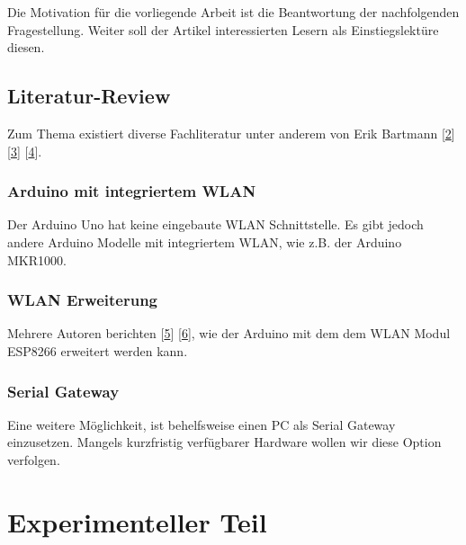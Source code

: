 \documentclass[
  ngerman,
  a4paper,
  12pt]{scrartcl}
\begin{document}
Die Motivation für die vorliegende Arbeit ist die Beantwortung der
nachfolgenden Fragestellung. Weiter soll der Artikel interessierten
Lesern als Einstiegslektüre diesen.

\hypertarget{literatur-review}{%
\subsection{Literatur-Review}\label{literatur-review}}

Zum Thema existiert diverse Fachliteratur unter anderem von Erik
Bartmann {[}\protect\hyperlink{ref-bartmannArduino}{2}{]}
{[}\protect\hyperlink{ref-bartmannESP8266}{3}{]}
{[}\protect\hyperlink{ref-bartmannESP32}{4}{]}.

\hypertarget{arduino-mit-integriertem-wlan}{%
\subsubsection{Arduino mit integriertem
WLAN}\label{arduino-mit-integriertem-wlan}}

Der Arduino Uno hat keine eingebaute WLAN Schnittstelle. Es gibt jedoch
andere Arduino Modelle mit integriertem WLAN, wie z.B. der Arduino
MKR1000.

\hypertarget{wlan-erweiterung}{%
\subsubsection{WLAN Erweiterung}\label{wlan-erweiterung}}

Mehrere Autoren berichten
{[}\protect\hyperlink{ref-temperatureDashboard}{5}{]}
{[}\protect\hyperlink{ref-websocketcommunication}{6}{]}, wie der Arduino
mit dem dem WLAN Modul ESP8266 erweitert werden kann.

\hypertarget{serial-gateway}{%
\subsubsection{Serial Gateway}\label{serial-gateway}}

Eine weitere Möglichkeit, ist behelfsweise einen PC als Serial Gateway
einzusetzen. Mangels kurzfristig verfügbarer Hardware wollen wir diese
Option verfolgen.

\hypertarget{experimenteller-teil}{%
\section{Experimenteller Teil}\label{experimenteller-teil}}
\end{document}
